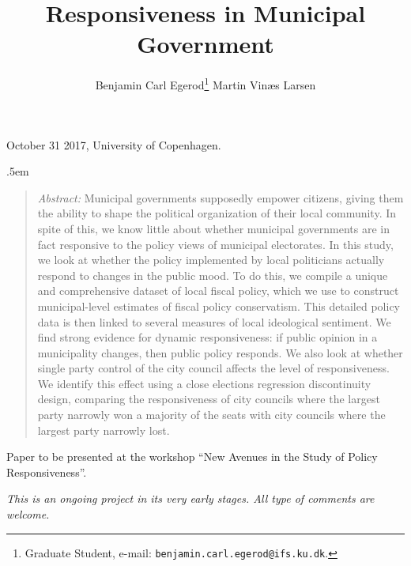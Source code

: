 \documentclass[a4paper,12pt]{article}
\title{\bigskip \bigskip \sffamily \LARGE Responsiveness in Municipal Government}
\author{\bigskip Benjamin Carl Egerod\footnote{Graduate Student, e-mail: \texttt{benjamin.carl.egerod@ifs.ku.dk}.} \qquad Martin Vinæs Larsen} %
\makeatletter
\renewcommand{\maketitle}{
	\begin{flushleft}
		
		\onehalfspacing
		
		\@title
		
		\lineskip .5em
		\normalfont{\normalsize{\@author}}
\end{flushleft}}
\makeatother
\begin{document}
	
	\begin{footnotesize} \noindent October 31 2017, University of Copenhagen. \end{footnotesize} %
	
	\vspace{0.7in}
	
	\maketitle
	
	\bigskip
	
	\begin{quotation} %

		\small \noindent \emph{Abstract:} Municipal governments supposedly empower citizens, giving them the ability to shape the political organization of their local community. In spite of this, we know little about whether municipal governments are in fact responsive to the policy views of municipal electorates. In this study, we look at whether the policy implemented by local politicians actually respond to changes in the public mood. To do this, we compile a unique and comprehensive dataset of local fiscal policy, which we use to construct municipal-level estimates of fiscal policy conservatism. This detailed policy data is then linked to several measures of local ideological sentiment. We find strong evidence for dynamic responsiveness: if public opinion in a municipality changes, then public policy responds. We also look at whether single party control of the city council affects the level of responsiveness. We identify this effect using a close elections regression discontinuity design, comparing the responsiveness of city councils where the largest party narrowly won a majority of the seats with city councils where the largest party narrowly lost.
	\end{quotation}

\bigskip

\bigskip

\bigskip
	
	
	\noindent Paper to be presented at the workshop “New Avenues in the Study of Policy Responsiveness”.
	 \newline 
	
	\thispagestyle{empty} %
	
	
	\bigskip
	\noindent \textit{This is an ongoing project in its very early stages. All type of comments are welcome.}
	\bigskip
	\bigskip
	
	
	
\end{document}
